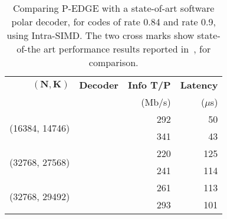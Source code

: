 \begin{table}[htp]
  \begin{center}
  \begin{tabular}{r  r  r  r}
    $\bm{(N, K)}$                   & \textbf{Decoder}     & \textbf{Info T/P} & \textbf{Latency} \\
                                    &                      &            (Mb/s) &         ($\mu$s) \\
    \hline
    \hline
    \multirow{2}{*}{(16384, 14746)} & \cite{Sarkis2014}    & 292                      & 50              \\
                                    & \cite{Cassagne2015c} & 341                      & 43              \\
    \hline
    \multirow{2}{*}{(32768, 27568)} & \cite{Sarkis2014}    & 220                      & 125             \\
                                    & \cite{Cassagne2015c} & 241                      & 114             \\
    \hline
    \multirow{2}{*}{(32768, 29492)} & \cite{Sarkis2014}    & 261                      & 113             \\
                                    & \cite{Cassagne2015c} & 293                      & 101             \\
  \end{tabular}
  \end{center}
  \caption{Comparing P-EDGE with a state-of-art software polar decoder, for
    codes of rate 0.84 and rate 0.9, using Intra-SIMD. The two cross marks show
    state-of-the art performance results reported in~\cite{Sarkis2014}, for
    comparison.}
  \label{tab:eval_polar_sc_gen_thr_comparison}
\end{table}

